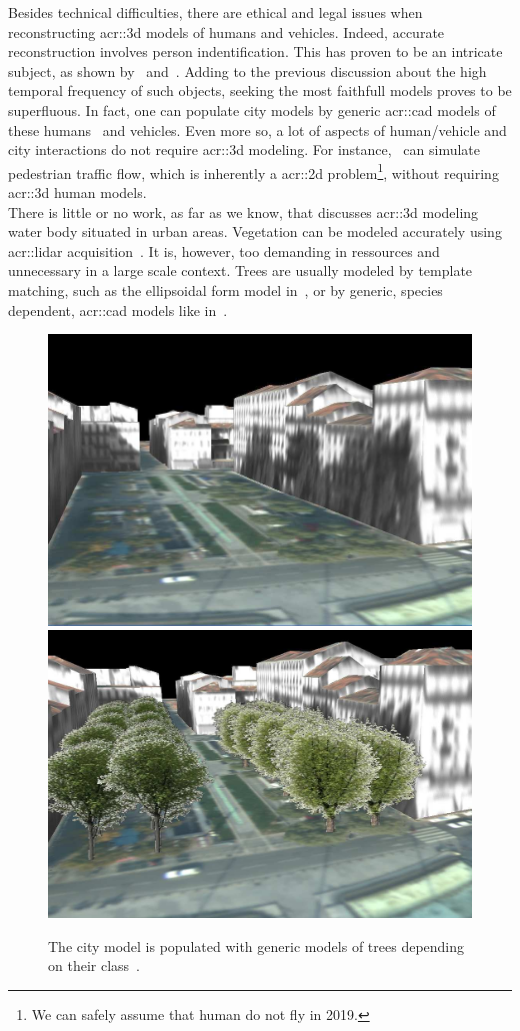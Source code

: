             Besides technical difficulties, there are ethical and legal issues when reconstructing \gls{acr::3d} models of humans and vehicles.
            Indeed, accurate reconstruction involves person indentification.
            This has proven to be an intricate subject, as shown by~\textcite{tavani2011ethics} and~\textcite{thornton2010individual}.
            Adding to the previous discussion about the high temporal frequency of such objects, seeking the most faithfull models proves to be superfluous.
            In fact, one can populate city models by generic \gls{acr::cad} models of these humans~\parencite{shao2007autonomous} and vehicles.
            Even more so, a lot of aspects of human/vehicle and city interactions do not require \gls{acr::3d} modeling.
            For instance,~\textcite{lovaas1994modeling} can simulate pedestrian traffic flow, which is inherently a \gls{acr::2d} problem\footnote{
                We can safely assume that human do not fly in 2019.
            }, without requiring \gls{acr::3d} human models.\\
            There is little or no work, as far as we know, that discusses \gls{acr::3d} modeling water body situated in urban areas.
            Vegetation can be modeled accurately using \gls{acr::lidar} acquisition~\parencite{omasa20063d}.
            It is, however, too demanding in ressources and unnecessary in a large scale context.
            Trees are usually modeled by template matching, such as the ellipsoidal form model in~\textcite{lafarge2012creating}, or by generic, species dependent, \gls{acr::cad} models like in~\textcite{iovan2008detection}.\\
            \begin{figure}[htpb]
                \centering
                \includegraphics[width=.45\textwidth]{images/introduction/modeling_trees_1}
                \includegraphics[width=.45\textwidth]{images/introduction/modeling_trees_2}
                \caption{
                    \label{fig::3d_tree_models} The city model is populated with generic models of trees depending on their class~\parencite{iovan2008detection}.
                }
            \end{figure}
